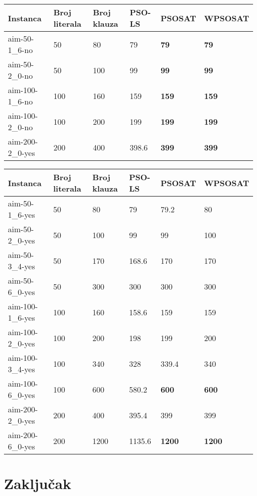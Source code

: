 \documentclass{article}
\begin{document}
\begin{table}[h!]
\centering
{}\label{tab:UNSAT}
\begin{tabular}{ |p{3cm}|p{2cm}|p{2cm}||p{2cm}|p{2cm}|p{2cm}| }
 \hline
 Instanca & Broj literala & Broj klauza & PSO-LS & PSOSAT & WPSOSAT\\
 \hline
 aim-50-1\_6-no & 50 & 80 & 79 & \textbf{79} & \textbf{79}\\
 \hline
 aim-50-2\_0-no & 50 & 100 & 99 & \textbf{99} & \textbf{99}\\
 \hline
 aim-100-1\_6-no & 100 & 160 & 159 & \textbf{159} & \textbf{159}\\
 \hline
 aim-100-2\_0-no & 100 & 200 & 199 & \textbf{199} & \textbf{199}\\
 \hline
 aim-200-2\_0-yes & 200 & 400 & 398.6 & \textbf{399} & \textbf{399}\\
 \hline
\end{tabular}
\end{table}

\begin{table}[h!]
\centering
{}\label{tab:SAT} 
\begin{tabular}{ |p{3cm}|p{2cm}|p{2cm}||p{2cm}|p{2cm}|p{2cm}|  }
 \hline
 Instanca & Broj literala & Broj klauza & PSO-LS & PSOSAT & WPSOSAT\\
 \hline
 aim-50-1\_6-yes & 50 & 80 & 79 & 79.2 & 80\\
 \hline
 aim-50-2\_0-yes & 50 & 100 & 99 & 99 & 100\\
 \hline
 aim-50-3\_4-yes & 50 & 170 & 168.6 & 170 & 170\\
 \hline
 aim-50-6\_0-yes & 50 & 300 & 300 & 300 & 300\\
 \hline
 \hline
 aim-100-1\_6-yes & 100 & 160 & 158.6 & 159 & 159\\
 \hline
 aim-100-2\_0-yes & 100 & 200 & 198 & 199 & 200\\
 \hline
 aim-100-3\_4-yes & 100 & 340 & 328 & 339.4 & 340\\
 \hline
 aim-100-6\_0-yes & 100 & 600 & 580.2 & \textbf{600} & \textbf{600}\\
 \hline
 \hline
 aim-200-2\_0-yes & 200 & 400 & 395.4 & 399 & 399\\
 \hline
 aim-200-6\_0-yes & 200 & 1200 & 1135.6 & \textbf{1200} & \textbf{1200}\\
 \hline
\end{tabular}
\end{table}


\section{Zaključak}
\label{sec:zakljucak}


\appendix
 

\end{document}

